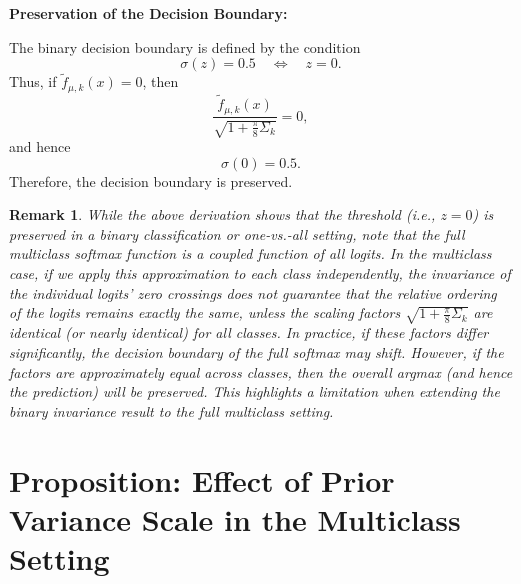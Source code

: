 \documentclass{article}
\newtheorem*{remark}{Remark}
\begin{document}
\vspace{1ex}
\textbf{Preservation of the Decision Boundary:}

The binary decision boundary is defined by the condition
\[
\sigma(z)=0.5 \quad \Longleftrightarrow \quad z=0.
\]
Thus, if $\tilde{f}_{\mu,k}(x)=0$, then
\[
\frac{\tilde{f}_{\mu,k}(x)}{\sqrt{1+\frac{\pi}{8}\Sigma_k}} = 0,
\]
and hence
\[
\sigma\!\left(0\right)=0.5.
\]
Therefore, the decision boundary is preserved.

\vspace{1ex}
\begin{remark}
While the above derivation shows that the threshold (i.e., $z=0$) is preserved in a binary classification or one-vs.-all setting, note that the full multiclass softmax function is a coupled function of all logits. In the multiclass case, if we apply this approximation to each class independently, the invariance of the individual logits’ zero crossings does \emph{not} guarantee that the relative ordering of the logits remains exactly the same, unless the scaling factors $\sqrt{1+\frac{\pi}{8}\Sigma_k}$ are identical (or nearly identical) for all classes. In practice, if these factors differ significantly, the decision boundary of the full softmax may shift. However, if the factors are approximately equal across classes, then the overall argmax (and hence the prediction) will be preserved. This highlights a limitation when extending the binary invariance result to the full multiclass setting.
\end{remark}

\section*{Proposition: Effect of Prior Variance Scale in the Multiclass Setting}
\end{document}
